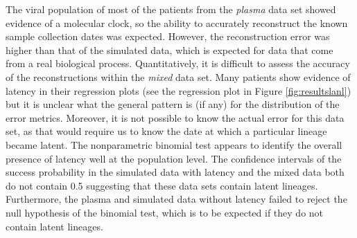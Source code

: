 \documentclass{bmcart}
\begin{document}
The viral population of most of the patients from the {\em plasma} data set showed evidence of a molecular clock, so the ability to accurately reconstruct the known sample collection dates was expected.
However, the reconstruction error was higher than that of the simulated data, which is expected for data that come from a real biological process.
Quantitatively, it is difficult to assess the accuracy of the reconstructions within the {\em mixed} data set. 
Many patients show evidence of latency in their regression plots (see the regression plot in Figure \ref{fig:resultslanl}) but it is unclear what the general pattern is (if any) for the distribution of the error metrics. 
Moreover, it is not possible to know the actual error for this data set, as that would require us to know the date at which a particular lineage became latent. 
The nonparametric binomial test appears to identify the overall presence of latency well at the population level.
The confidence intervals of the success probability in the simulated data with latency and the mixed data both do not contain 0.5 suggesting that these data sets contain latent lineages.
Furthermore, the plasma and simulated data without latency failed to reject the null hypothesis of the binomial test, which is to be expected if they do not contain latent lineages.


\end{document}
